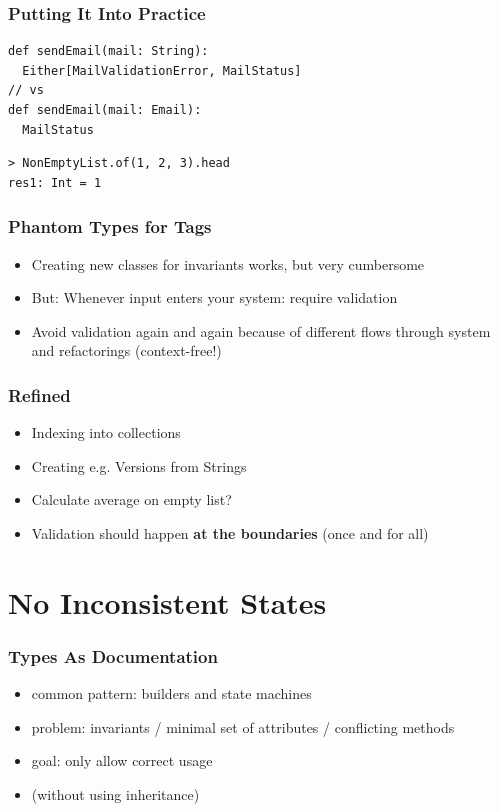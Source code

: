 \documentclass{beamer}
\begin{document}
\begin{frame}
  \frametitle{Putting It Into Practice}
\begin{verbatim}
def sendEmail(mail: String): 
  Either[MailValidationError, MailStatus]
// vs
def sendEmail(mail: Email): 
  MailStatus
\end{verbatim}
\begin{verbatim}
> NonEmptyList.of(1, 2, 3).head
res1: Int = 1
\end{verbatim}
\end{frame}

\begin{frame}
  \frametitle{Phantom Types for Tags}
  \begin{itemize}
  \item Creating new classes for invariants works, but very cumbersome
  \item But: Whenever input enters your system: require validation
  \item Avoid validation again and again because of different flows
    through system and refactorings (context-free!)
  \end{itemize}
\end{frame}

\begin{frame}
  \frametitle{Refined}
  \begin{itemize}
  \item Indexing into collections
  \item Creating e.g. Versions from Strings
  \item Calculate average on empty list?
  \item Validation should happen \textbf{at the boundaries} (once and
    for all)
  \end{itemize}
\end{frame}

\section{No Inconsistent States}

\begin{frame}
  \frametitle{Types As Documentation}
  \begin{itemize}
  \item common pattern: builders and state machines
  \item problem: invariants / minimal set of attributes / conflicting
    methods
  \item goal: only allow correct usage
  \item (without using inheritance)
  \end{itemize}
\end{frame}
\end{document}

